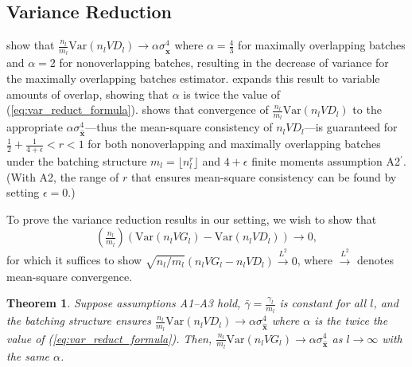 \documentclass[12pt]{article}
\newtheorem{theorem}{Theorem}
\newcommand{\var}[1]{\mathrm{Var} \left( #1 \right)}
\newcommand{\x}{\mathbf{x}}
\newcommand{\xh}{{\hat{\x}}}
\newcommand{\gammab}{\bar{\gamma}}
\begin{document}
\subsection{Variance Reduction}
\label{ssec:var_reduct}

\citet{Meketon1984} show that $\frac{n_l}{m_l}\var{n_l VD_l} \rightarrow \alpha \sigma^4_{\xh}$ where $\alpha = \frac{4}{3}$ for maximally overlapping batches and $\alpha = 2$ for nonoverlapping batches, resulting in the decrease of variance for the maximally overlapping batches estimator.  
\citet{Welch1987} expands this result to variable amounts of overlap, showing that $\alpha$ is twice the value of (\ref{eq:var_reduct_formula}).  
\citet{damerdji1995mean} shows that convergence of $\frac{n_l}{m_l}\var{n_l VD_l}$ to the appropriate $\alpha \sigma^4_{\xh}$---thus the mean-square consistency of $n_l VD_l$---is guaranteed for $\tfrac{1}{2} + \tfrac{1}{4+\epsilon} < r < 1$ for both nonoverlapping and maximally overlapping batches under the batching structure $m_l = \lfloor n_l^r \rfloor$ and $4+\epsilon$ finite moments assumption A2$^\prime$.  
(With A2, the range of $r$ that ensures mean-square consistency can be found by setting $\epsilon=0$.)

To prove the variance reduction results in our setting, we wish to show that 
$$
(\tfrac{n_l}{m_l}) \left( \var{n_l VG_l} - \var{n_l VD_l} \right) \rightarrow 0,
$$
for which it suffices to show $\sqrt{{n_l}/{m_l}} \left( n_l VG_l - n_l VD_l \right) \xrightarrow{L^2} 0$, where $\xrightarrow{L^2}$ denotes mean-square convergence.

%


\begin{theorem} \label{thm:varvar_conv}
	Suppose assumptions A1--A3 hold, $\gammab = \frac{\gamma_l}{m_l}$ is constant for all $l$, and the batching structure ensures  $\frac{n_l}{m_l}\var{n_l VD_l} \rightarrow \alpha \sigma^4_{\xh}$ where $\alpha$ is the twice the value of (\ref{eq:var_reduct_formula}). 
        Then, $\frac{n_l}{m_l}\var{n_l VG_l} \rightarrow \alpha \sigma^4_{\xh}$ as $l \rightarrow \infty$ with the same $\alpha$. 
\end{theorem}
\end{document}
